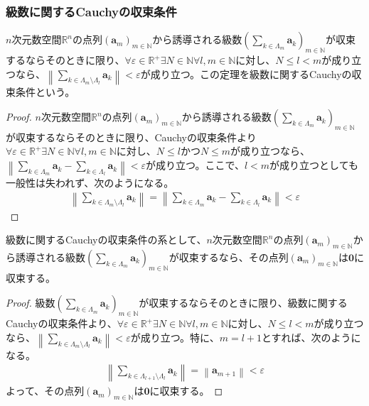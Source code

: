 \documentclass[dvipdfmx]{jsarticle}
\begin{document}
\subsubsection{級数に関するCauchyの収束条件}%
\begin{thm}[級数に関するCauchyの収束条件]\label{4.1.8.4}
$n$次元数空間$\mathbb{R}^{n}$の点列$\left( \mathbf{a}_{m} \right)_{m \in \mathbb{N}}$から誘導される級数$\left( \sum_{k \in \varLambda_{m}} \mathbf{a}_{k} \right)_{m \in \mathbb{N}}$が収束するならそのときに限り、$\forall\varepsilon \in \mathbb{R}^{+}\exists N \in \mathbb{N}\forall l,m \in \mathbb{N}$に対し、$N \leq l < m$が成り立つなら、$\left\| \sum_{k \in \varLambda_{m} \setminus \varLambda_{l}} \mathbf{a}_{k} \right\| < \varepsilon$が成り立つ。この定理を級数に関するCauchyの収束条件という。
\end{thm}
\begin{proof}
$n$次元数空間$\mathbb{R}^{n}$の点列$\left( \mathbf{a}_{m} \right)_{m \in \mathbb{N}}$から誘導される級数$\left( \sum_{k \in \varLambda_{m}} \mathbf{a}_{k} \right)_{m \in \mathbb{N}}$が収束するならそのときに限り、Cauchyの収束条件より$\forall\varepsilon \in \mathbb{R}^{+}\exists N \in \mathbb{N}\forall l,m \in \mathbb{N}$に対し、$N \leq l$かつ$N \leq m$が成り立つなら、$\left\| \sum_{k \in \varLambda_{m}} \mathbf{a}_{k} - \sum_{k \in \varLambda_{l}} \mathbf{a}_{k} \right\| < \varepsilon$が成り立つ。ここで、$l < m$が成り立つとしても一般性は失われず、次のようになる。
\begin{align*}
\left\| \sum_{k \in \varLambda_{m} \setminus \varLambda_{l}} \mathbf{a}_{k} \right\| = \left\| \sum_{k \in \varLambda_{m}} \mathbf{a}_{k} - \sum_{k \in \varLambda_{l}} \mathbf{a}_{k} \right\| < \varepsilon
\end{align*}
\end{proof}
\begin{thm}\label{4.1.8.5}
級数に関するCauchyの収束条件の系として、$n$次元数空間$\mathbb{R}^{n}$の点列$\left( \mathbf{a}_{m} \right)_{m \in \mathbb{N}}$から誘導される級数$\left( \sum_{k \in \varLambda_{m}} \mathbf{a}_{k} \right)_{m \in \mathbb{N}}$が収束するなら、その点列$\left( \mathbf{a}_{m} \right)_{m \in \mathbb{N}}$は$\mathbf{0}$に収束する。
\end{thm}
\begin{proof}
級数$\left( \sum_{k \in \varLambda_{m}} \mathbf{a}_{k} \right)_{m \in \mathbb{N}}$が収束するならそのときに限り、級数に関するCauchyの収束条件より、$\forall\varepsilon \in \mathbb{R}^{+}\exists N \in \mathbb{N}\forall l,m \in \mathbb{N}$に対し、$N \leq l < m$が成り立つなら、$\left\| \sum_{k \in \varLambda_{m} \setminus \varLambda_{l}} \mathbf{a}_{k} \right\| < \varepsilon$が成り立つ。特に、$m = l + 1$とすれば、次のようになる。
\begin{align*}
\left\| \sum_{k \in \varLambda_{l + 1} \setminus \varLambda_{l}} \mathbf{a}_{k} \right\| = \left\| \mathbf{a}_{m + 1} \right\| < \varepsilon
\end{align*}
よって、その点列$\left( \mathbf{a}_{m} \right)_{m \in \mathbb{N}}$は$\mathbf{0}$に収束する。
\end{proof}
\end{document}
